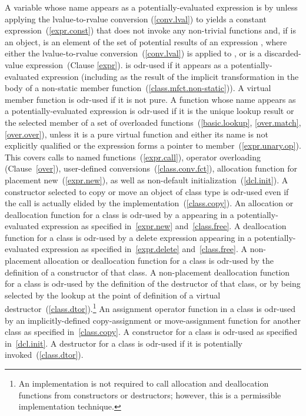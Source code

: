 \pnum
A variable  whose name appears as a
potentially-evaluated expression  is  by  unless
applying the lvalue-to-rvalue conversion (\ref{conv.lval}) to  yields
a constant expression~(\ref{expr.const}) that does not invoke any non-trivial
functions
and, if  is an object,  is an element of
the set of potential results of an expression , where either the lvalue-to-rvalue
conversion~(\ref{conv.lval}) is applied to , or  is
a discarded-value expression~(Clause \ref{expr}).
 is odr-used if it appears as a potentially-evaluated expression
(including as the result of the implicit transformation in the body of a non-static
member function~(\ref{class.mfct.non-static})).
A virtual member
function is odr-used if it is not pure.
A function whose name appears as a potentially-evaluated
expression is odr-used if it is the unique lookup result or the selected
member of a set of overloaded functions~(\ref{basic.lookup}, \ref{over.match}, \ref{over.over}),
unless it is a pure virtual function and either
its name is not explicitly qualified or
the expression forms a pointer to member~(\ref{expr.unary.op}).
\enternote This covers calls to named
functions~(\ref{expr.call}), operator overloading (Clause~\ref{over}),
user-defined conversions~(\ref{class.conv.fct}), allocation function for
placement new~(\ref{expr.new}), as well as non-default
initialization~(\ref{dcl.init}). A constructor selected to copy or move an
object of class type is odr-used even if the
call is actually elided by the implementation~(\ref{class.copy}). \exitnote An allocation
or deallocation function for a class is odr-used by a 
appearing in a potentially-evaluated expression as specified
in~\ref{expr.new} and~\ref{class.free}. A deallocation function for a
class is odr-used by a delete expression appearing in a
potentially-evaluated expression as specified in~\ref{expr.delete}
and~\ref{class.free}. A non-placement allocation or deallocation
function for a class is odr-used by the definition of a constructor of that
class. A non-placement deallocation function for a class is odr-used by the
definition of the destructor of that class, or by being selected by the
lookup at the point of definition of a virtual
destructor~(\ref{class.dtor}).\footnote{An implementation is not required
to call allocation and
deallocation functions from constructors or destructors; however, this
is a permissible implementation technique.}
An assignment operator function in a class is odr-used by an
implicitly-defined
copy-assignment or move-assignment function for another class as specified
in~\ref{class.copy}.
A constructor for a class is odr-used as specified
in~\ref{dcl.init}. A destructor for a class is odr-used if it is potentially
invoked~(\ref{class.dtor}).

